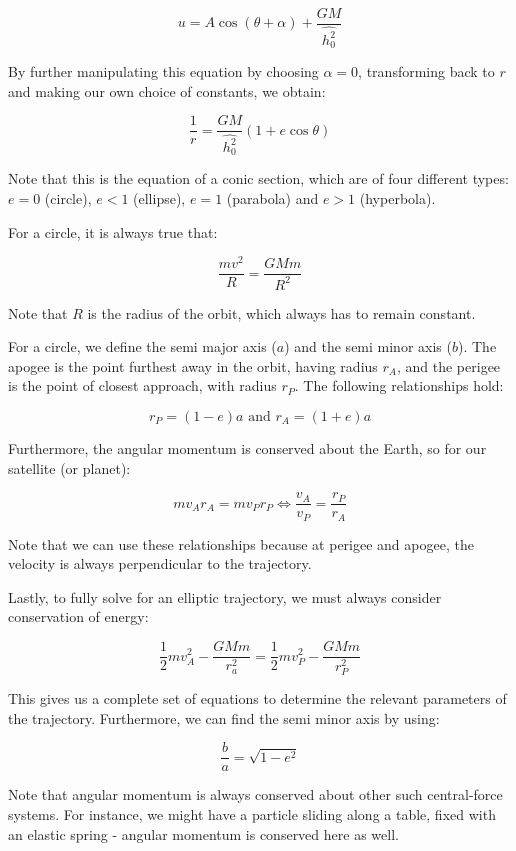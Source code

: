 \documentclass[12pt]{article}
\begin{document}
\[ u = A\cos{\left(\theta + \alpha\right)} + \frac{GM}{\hat{h_0^2}} \]

By further manipulating this equation by choosing $\alpha = 0$, transforming back to $r$ and making our own choice of constants, we obtain:

\[ \frac{1}{r} = \frac{GM}{\hat{h_0^2}}\left(1 + e\cos{\theta}\right) \]

Note that this is the equation of a conic section, which are of four different types: $e = 0$ (circle), $e < 1$ (ellipse), $e = 1$ (parabola) and $e > 1$ (hyperbola).

\begin{proposition}
    For a circle, it is always true that:

    \[ \frac{mv^2}{R} = \frac{GMm}{R^2} \]

    Note that $R$ is the radius of the orbit, which always has to remain constant.
\end{proposition}

\begin{proposition}
    For a circle, we define the semi major axis ($a$) and the semi minor axis ($b$). The apogee is the point furthest away in the orbit, having radius $r_A$, and the perigee is the point of closest approach, with radius $r_P$. The following relationships hold:

    \[ r_P = \left(1 - e\right)a \text{   and   } r_A = \left(1 + e\right)a\]

    Furthermore, the angular momentum is conserved about the Earth, so for our satellite (or planet):

    \[ mv_Ar_A = mv_Pr_P \Leftrightarrow \frac{v_A}{v_P} = \frac{r_P}{r_A} \]

    Note that we can use these relationships because at perigee and apogee, the velocity is always perpendicular to the trajectory.

    Lastly, to fully solve for an elliptic trajectory, we must always consider conservation of energy:

    \[ \frac{1}{2}mv_A^2 - \frac{GMm}{r_a^2} = \frac{1}{2}mv_P^2 - \frac{GMm}{r_P^2} \]

    This gives us a complete set of equations to determine the relevant parameters of the trajectory. Furthermore, we can find the semi minor axis by using:

    \[ \frac{b}{a} = \sqrt{1 - e^2} \]
\end{proposition}

Note that angular momentum is always conserved about other such central-force systems. For instance, we might have a particle sliding along a table, fixed with an elastic spring - angular momentum is conserved here as well.
\end{document}
